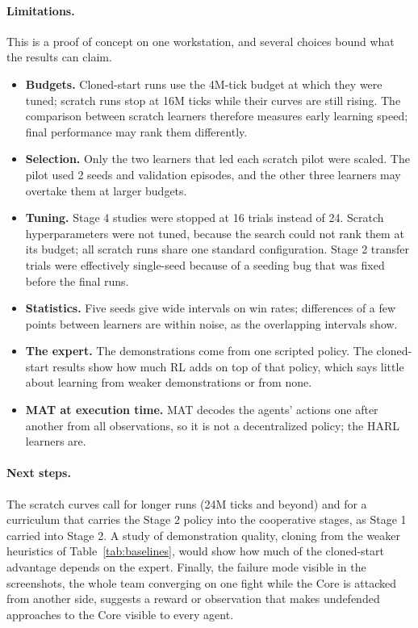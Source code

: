 \documentclass[11pt]{article}
\begin{document}
\paragraph{Limitations.} This is a proof of concept on one workstation, and several choices bound what the results can claim.
\begin{itemize}
    \item \textbf{Budgets.} Cloned-start runs use the 4M-tick budget at which they were tuned; scratch runs stop at 16M ticks while their curves are still rising. The comparison between scratch learners therefore measures early learning speed; final performance may rank them differently.
    \item \textbf{Selection.} Only the two learners that led each scratch pilot were scaled. The pilot used 2 seeds and validation episodes, and the other three learners may overtake them at larger budgets.
    \item \textbf{Tuning.} Stage 4 studies were stopped at 16 trials instead of 24. Scratch hyperparameters were not tuned, because the search could not rank them at its budget; all scratch runs share one standard configuration. Stage 2 transfer trials were effectively single-seed because of a seeding bug that was fixed before the final runs.
    \item \textbf{Statistics.} Five seeds give wide intervals on win rates; differences of a few points between learners are within noise, as the overlapping intervals show.
    \item \textbf{The expert.} The demonstrations come from one scripted policy. The cloned-start results show how much RL adds on top of that policy, which says little about learning from weaker demonstrations or from none.
    \item \textbf{MAT at execution time.} MAT decodes the agents' actions one after another from all observations, so it is not a decentralized policy; the HARL learners are.
\end{itemize}

\paragraph{Next steps.} The scratch curves call for longer runs (24M ticks and beyond) and for a curriculum that carries the Stage 2 policy into the cooperative stages, as Stage 1 carried into Stage 2. A study of demonstration quality, cloning from the weaker heuristics of Table~\ref{tab:baselines}, would show how much of the cloned-start advantage depends on the expert. Finally, the failure mode visible in the screenshots, the whole team converging on one fight while the Core is attacked from another side, suggests a reward or observation that makes undefended approaches to the Core visible to every agent.



\end{document}
